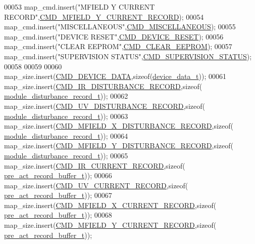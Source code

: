 \begin{DoxyCode}
00053     map\_cmd.insert(\textcolor{stringliteral}{"MFIELD Y  CURRENT RECORD"},\hyperlink{a00031_a8ddac7f7a2a90f2d8535af02e338b1bf}{CMD\_MFIELD\_Y\_CURRENT\_RECORD});
00054     map\_cmd.insert(\textcolor{stringliteral}{"MISCELLANEOUS"},\hyperlink{a00031_a1c028104d44ece3aca38373da0345c04}{CMD\_MISCELLANEOUS});
00055     map\_cmd.insert(\textcolor{stringliteral}{"DEVICE RESET"},\hyperlink{a00031_ac4c8a78ea50054745a0ac0792baa7657}{CMD\_DEVICE\_RESET});
00056     map\_cmd.insert(\textcolor{stringliteral}{"CLEAR EEPROM"},\hyperlink{a00031_a9084e0a84e73318b6fad9841fb4d4f98}{CMD\_CLEAR\_EEPROM});
00057     map\_cmd.insert(\textcolor{stringliteral}{"SUPERVISION STATUS"},\hyperlink{a00031_ad6af9210ac0903986f3ac3e55c6816a3}{CMD\_SUPERVISION\_STATUS});
00058 
00059 
00060     map\_size.insert(\hyperlink{a00031_a4412fcb90fb9171d432a624428881e70}{CMD\_DEVICE\_DATA},\textcolor{keyword}{sizeof}(\hyperlink{a00003_a95029dff9c90f6a6907353ba86eb3f33}{device\_data\_t}));
00061     map\_size.insert(\hyperlink{a00031_ad37cd290161f0a245d189c3f4e014d4e}{CMD\_IR\_DISTURBANCE\_RECORD},\textcolor{keyword}{sizeof}(
      \hyperlink{a00008}{module\_disturbance\_record\_t}));
00062     map\_size.insert(\hyperlink{a00031_ae45bb46748497c6a117beb1e93072d83}{CMD\_UV\_DISTURBANCE\_RECORD},\textcolor{keyword}{sizeof}(
      \hyperlink{a00008}{module\_disturbance\_record\_t}));
00063     map\_size.insert(\hyperlink{a00031_ab84aea346a3f75b58f8bda67b8ae9be0}{CMD\_MFIELD\_X\_DISTURBANCE\_RECORD},\textcolor{keyword}{sizeof}(
      \hyperlink{a00008}{module\_disturbance\_record\_t}));
00064     map\_size.insert(\hyperlink{a00031_af77e9c0ad32b3cc50d61992d4b64a831}{CMD\_MFIELD\_Y\_DISTURBANCE\_RECORD},\textcolor{keyword}{sizeof}(
      \hyperlink{a00008}{module\_disturbance\_record\_t}));
00065     map\_size.insert(\hyperlink{a00031_a4dcce4fd3ff29eb6782f3228901f99cf}{CMD\_IR\_CURRENT\_RECORD},\textcolor{keyword}{sizeof}(
      \hyperlink{a00003_d4/d7d/a00093}{pre\_act\_record\_buffer\_t}));
00066     map\_size.insert(\hyperlink{a00031_ab0e0364ddc2d95d1e5b51a3e3ff50918}{CMD\_UV\_CURRENT\_RECORD},\textcolor{keyword}{sizeof}(
      \hyperlink{a00003_d4/d7d/a00093}{pre\_act\_record\_buffer\_t}));
00067     map\_size.insert(\hyperlink{a00031_ab796345ffdbc6a240b67b56583bb77c6}{CMD\_MFIELD\_X\_CURRENT\_RECORD},\textcolor{keyword}{sizeof}(
      \hyperlink{a00003_d4/d7d/a00093}{pre\_act\_record\_buffer\_t}));
00068     map\_size.insert(\hyperlink{a00031_a8ddac7f7a2a90f2d8535af02e338b1bf}{CMD\_MFIELD\_Y\_CURRENT\_RECORD},\textcolor{keyword}{sizeof}(
      \hyperlink{a00003_d4/d7d/a00093}{pre\_act\_record\_buffer\_t}));

\end{DoxyCode}
